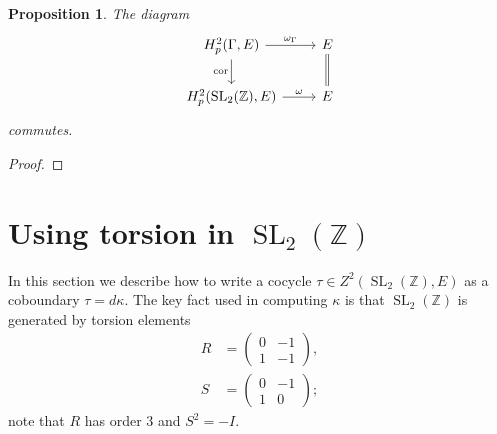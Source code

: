 \documentclass[10pt]{amsart}
\theoremstyle{plain}
\newtheorem{proposition}[theorem]{Proposition}
\theoremstyle{definition}
\newcommand{\ZZ}{{\mathbb{Z}}}
\DeclareMathOperator{\SL}{SL}
\DeclareMathOperator{\cor}{cor}
\begin{document}
\begin{proposition}
The diagram
\[
\begin{tikzcd}
H^2_p(\Gamma, E) \ar{r}{\omega_\Gamma} \ar[swap]{d}{\cor} & E \ar[equal]{d} \\
H^2_p(\SL_2(\ZZ), E) \ar{r}{\omega} & E
\end{tikzcd}
\]
commutes.
\end{proposition}
\begin{proof}

\end{proof}

\section{Using torsion in \texorpdfstring{$\SL_2(\ZZ)$}{SL(2,Z)}} \label{sec:using_torsion}

In this section we describe how to write a cocycle $\tau \in Z^2(\SL_2(\ZZ), E)$ as a coboundary $\tau = d\kappa$.
The key fact used in computing $\kappa$ is that $\SL_2(\ZZ)$ is generated by torsion elements
\begin{align*}
R &= \begin{pmatrix} 0 & -1 \\ 1 & -1 \end{pmatrix}, \\
S &= \begin{pmatrix} 0 & -1 \\ 1 & 0 \end{pmatrix};
\end{align*}
note that $R$ has order $3$ and $S^2 = -I$.
\end{document}

